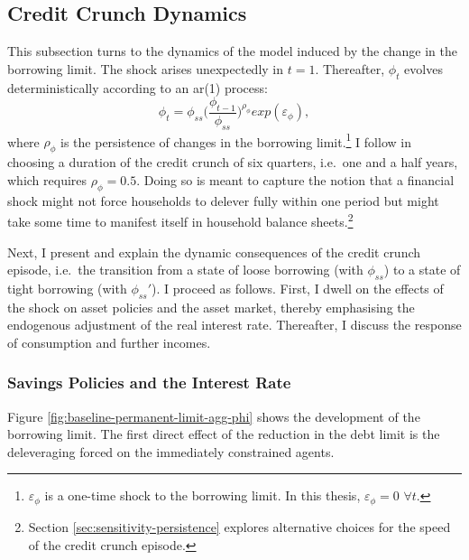 \documentclass[12pt]{article} %
\numberwithin{equation}{section} %
\numberwithin{figure}{section}
\numberwithin{table}{section}
\begin{document}
\subsection{Credit Crunch Dynamics}
\label{sec:limit-transition}

This subsection turns to the dynamics of the model induced by the change in the borrowing limit. The shock arises unexpectedly in $t=1$. Thereafter, $\phi_t$ evolves deterministically according to an \Gls{ar}(1) process:
\begin{equation}
    \phi_t = \phi_{ss} \Bigg( \frac{\phi_{t-1}}{\phi_{ss}} \Bigg)^{\rho_{\phi}} exp(\varepsilon_{\phi}), \label{eq:borrowing-limit-process}
\end{equation}
where $\rho_{\phi}$ is the persistence of changes in the borrowing limit.\footnote{$\varepsilon_{\phi}$ is a one-time shock to the borrowing limit. In this thesis, $\varepsilon_{\phi} = 0$ $\forall t$.} I follow \textcite{gl2017} in choosing a duration of the credit crunch of six quarters, i.e.~one and a half years, which requires $\rho_{\phi} = 0.5$. Doing so is meant to capture the notion that a financial shock might not force households to delever fully within one period but might take some time to manifest itself in household balance sheets.\footnote{Section \ref{sec:sensitivity-persistence} explores alternative choices for the speed of the credit crunch episode.} 

Next, I present and explain the dynamic consequences of the credit crunch episode, i.e.~the transition from a state of loose borrowing (with $\phi_{ss}$) to a state of tight borrowing (with $\phi_{ss}'$). I proceed as follows. First, I dwell on the effects of the shock on asset policies and the asset market, thereby emphasising the endogenous adjustment of the real interest rate. Thereafter, I discuss the response of consumption and further incomes. 

\subsubsection{Savings Policies and the Interest Rate}

Figure \ref{fig:baseline-permanent-limit-agg-phi} shows the development of the borrowing limit. The first direct effect of the reduction in the debt limit is the deleveraging forced on the immediately constrained agents.
\end{document}
